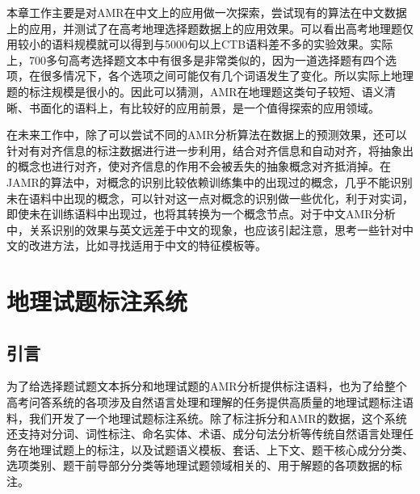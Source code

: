 \documentclass[master, winfont]{njuthesis}
\begin{document}
本章工作主要是对AMR在中文上的应用做一次探索，尝试现有的算法在中文数据上的应用，并测试了在高考地理选择题数据上的应用效果。可以看出高考地理题仅用较小的语料规模就可以得到与5000句以上CTB语料差不多的实验效果。实际上，700多句高考选择题文本中有很多是非常类似的，因为一道选择题有四个选项，在很多情况下，各个选项之间可能仅有几个词语发生了变化。所以实际上地理题的标注规模是很小的。因此可以猜测，AMR在地理题这类句子较短、语义清晰、书面化的语料上，有比较好的应用前景，是一个值得探索的应用领域。

在未来工作中，除了可以尝试不同的AMR分析算法在数据上的预测效果，还可以针对有对齐信息的标注数据进行进一步利用，结合对齐信息和自动对齐，将抽象出的概念也进行对齐，使对齐信息的作用不会被丢失的抽象概念对齐抵消掉。在JAMR的算法中，对概念的识别比较依赖训练集中的出现过的概念，几乎不能识别未在语料中出现的概念，可以针对这一点对概念的识别做一些优化，利于对实词，即使未在训练语料中出现过，也将其转换为一个概念节点。对于中文AMR分析中，关系识别的效果与英文远差于中文的现象，也应该引起注意，思考一些针对中文的改进方法，比如寻找适用于中文的特征模板等。


\chapter{地理试题标注系统}
\label{chapter:tagger}
\section{引言}
为了给选择题试题文本拆分和地理试题的AMR分析提供标注语料，也为了给整个高考问答系统的各项涉及自然语言处理和理解的任务提供高质量的地理试题标注语料，我们开发了一个地理试题标注系统。除了标注拆分和AMR的数据，这个系统还支持对分词、词性标注、命名实体、术语、成分句法分析等传统自然语言处理任务在地理试题上的标注，以及试题语义模板、套话、上下文、题干核心成分分类、选项类别、题干前导部分分类等地理试题领域相关的、用于解题的各项数据的标注。
\end{document}
